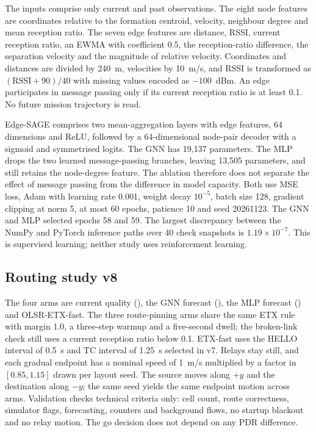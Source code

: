 The inputs comprise only current and past observations. The eight node features
are coordinates relative to the formation centroid, velocity, neighbour degree
and mean reception ratio. The seven edge features are distance, RSSI, current
reception ratio, an EWMA with coefficient 0.5, the reception-ratio difference,
the separation velocity and the magnitude of relative velocity. Coordinates and
distances are divided by 240~m, velocities by 10~m/s, and RSSI is transformed as
$(\mathrm{RSSI}+90)/40$ with missing values encoded as $-100$~dBm. An edge
participates in message passing only if its current reception ratio is at least
0.1. No future mission trajectory is read.

Edge-SAGE comprises two mean-aggregation layers with edge features, 64
dimensions and ReLU, followed by a 64-dimensional node-pair decoder with a
sigmoid and symmetrised logits. The GNN has 19{,}137 parameters. The MLP drops
the two learned message-passing branches, leaving 13{,}505 parameters, and still
retains the node-degree feature. The ablation therefore does not separate the
effect of message passing from the difference in model capacity. Both use MSE
loss, Adam with learning rate 0.001, weight decay $10^{-5}$, batch size 128,
gradient clipping at norm 5, at most 60 epochs, patience 10 and seed 20261123.
The GNN and MLP selected epochs 58 and 59. The largest discrepancy between the
NumPy and PyTorch inference paths over 40 check snapshots is
$1.19\times10^{-7}$. This is supervised learning; neither study uses
reinforcement learning.

\subsection{Routing study v8}\label{sub:v8}
The four arms are current quality (), the GNN forecast
(), the MLP forecast () and OLSR-ETX-fast. The
three route-pinning arms share the same ETX rule with margin 1.0, a three-step
warmup and a five-second dwell; the broken-link check still uses a current
reception ratio below 0.1. ETX-fast uses the HELLO interval of 0.5~s and TC
interval of 1.25~s selected in v7. Relays stay still, and each gradual endpoint
has a nominal speed of 1~m/s multiplied by a factor in $[0.85, 1.15]$ drawn per
layout seed. The source moves along $+y$ and the destination along $-y$; the
same seed yields the same endpoint motion across arms. Validation checks
technical criteria only: cell count, route correctness, simulator flags,
forecasting, counters and background flows, no startup blackout and no relay
motion. The go decision does not depend on any PDR difference.

